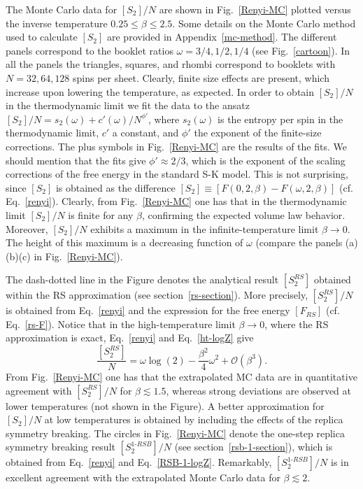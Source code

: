 \documentclass[twocolumn,superscriptaddress,prb,10pt]{revtex4-1}
\begin{document}
The Monte Carlo data for $[S_2]/N$  are shown in Fig.~\ref{Renyi-MC} plotted versus the 
inverse temperature $0.25\le\beta\le 2.5$. Some details on the Monte Carlo method used 
to calculate $[S_2]$ are provided in Appendix~\ref{mc-method}. The different panels 
correspond to the booklet ratios $\omega=3/4,1/2,1/4$ (see Fig.~\ref{cartoon}). In all the 
panels the triangles, squares, and rhombi correspond to booklets with $N=32,64,128$ spins 
per sheet. Clearly, finite size effects are present, which increase upon lowering 
the temperature, as expected. In order to obtain $[S_2]/N$ in the thermodynamic limit 
we fit the data to the ansatz $[S_2]/N=s_2(\omega)+c'(\omega)/N^{\phi'}$, where 
$s_2(\omega)$ is the entropy per spin in the thermodynamic limit, $c'$ a constant, and 
$\phi'$ the exponent of the finite-size corrections. The plus symbols in Fig.~\ref{Renyi-MC} 
are the results of the fits. We should mention that the fits give $\phi'\approx 2/3$, 
which is the exponent of the scaling corrections of the free energy in the standard 
S-K model. This is not surprising, since $[S_2]$ is obtained as the difference 
$[S_2]\equiv [F(0,2,\beta)-F(\omega,2,\beta)]$ (cf. Eq.~\eqref{renyi}). 
Clearly, from Fig.~\ref{Renyi-MC} one has that in the thermodynamic limit $[S_2]/N$ is 
finite for any $\beta$, confirming the expected volume law behavior. Moreover, $[S_2]/N$ 
exhibits a maximum in the infinite-temperature limit $\beta\to0$. The height of this 
maximum  is a decreasing function of $\omega$ (compare the panels (a)(b)(c) in 
Fig.~\ref{Renyi-MC}). 

The dash-dotted line in the Figure denotes the analytical result $[S_2^{RS}]$ obtained within 
the RS approximation (see section~\ref{rs-section}). More precisely, $[S_2^{RS}]/N$ is obtained 
from Eq.~\eqref{renyi} and the expression for the free energy $[F_{RS}]$ (cf. Eq.~\eqref{rs-F}). 
Notice that in the high-temperature limit $\beta\to0$, where the RS approximation is exact, 
Eq.~\eqref{renyi} and Eq.~\eqref{ht-logZ} give 
%
\begin{equation}
\frac{[S^{RS}_2]}{N}=\omega\log(2)-\frac{\beta^2}{4}\omega^2+{\mathcal O}(\beta^3).
\end{equation}
%
From Fig.~\ref{Renyi-MC} one has that the extrapolated MC data are in quantitative 
agreement with $[S_2^{RS}]/N$ for $\beta\lesssim 1.5$, whereas strong deviations are 
observed at lower temperatures (not shown in the Figure). A better approximation for 
$[S_2]/N$ at low temperatures is obtained by including the effects of the replica 
symmetry breaking. The circles in Fig.~\ref{Renyi-MC} denote the one-step replica 
symmetry breaking result $[S_2^{1\textrm{-}RSB}]/N$ (see section~\ref{rsb-1-section}), 
which is obtained from Eq.~\eqref{renyi}  and Eq.~\eqref{RSB-1-logZ}. Remarkably, 
$[S_2^{1\textrm{-}RSB}]/N$ is in excellent agreement with the extrapolated Monte Carlo 
data for $\beta\lesssim 2$. 
\end{document}

